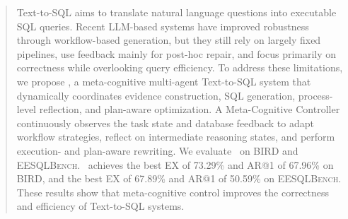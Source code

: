 \begin{abstract}
	Text-to-SQL aims to translate natural language questions into executable SQL queries. 
	Recent LLM-based systems have improved robustness through workflow-based generation, but they still rely on largely fixed pipelines, use feedback mainly for post-hoc repair, and focus primarily on correctness while overlooking query efficiency. 
	To address these limitations, we propose \toolname, a meta-cognitive multi-agent Text-to-SQL system that dynamically coordinates evidence construction, SQL generation, process-level reflection, and plan-aware optimization.
	A Meta-Cognitive Controller continuously observes the task state and database feedback to adapt workflow strategies, reflect on intermediate reasoning states, and perform execution- and plan-aware rewriting.
	We evaluate \toolname\ on \textsc{BIRD} and \textsc{EESQLBench}. 
	\toolname\ achieves the best EX of 73.29\% and AR@1 of 67.96\% on \textsc{BIRD}, and the best EX of 67.89\% and AR@1 of 50.59\% on \textsc{EESQLBench}. 
	These results show that meta-cognitive control improves the correctness and efficiency of Text-to-SQL systems.
\end{abstract}